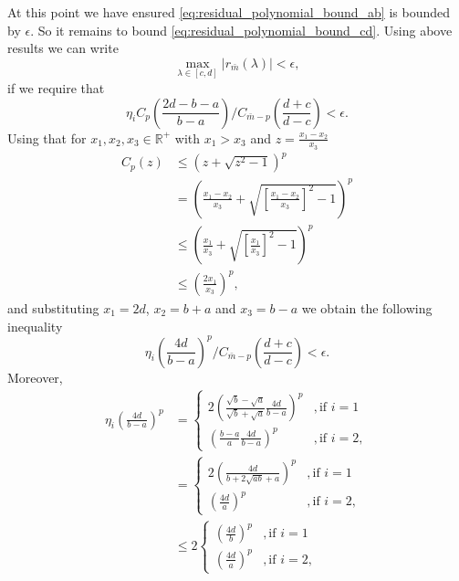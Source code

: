 At this point we have ensured \cref{eq:residual_polynomial_bound_ab} is bounded by $\epsilon$. So it remains to bound \cref{eq:residual_polynomial_bound_cd}. Using above results we can write 
\begin{equation*}
    \max_{\lambda \in [c,d]} |r_{\bar{m}}(\lambda)| < \epsilon,
\end{equation*}
if we require that
\begin{equation}
    \eta_i C_{p}\left(\frac{2d - b - a}{b - a}\right) /C_{\bar{m}-p}\left(\frac{d+c}{d-c}\right) < \epsilon.
    \label{eq:relative_error_bound_mp}
\end{equation}
Using that for $x_1, x_2, x_3 \in \mathbb{R}^+$ with $x_1 > x_3$ and $z = \frac{x_1 - x_2}{x_3}$
\begin{align*}
    C_p(z) & \leq \left(z + \sqrt{z^2 - 1}\right)^p \\
    & = \left( \frac{x_1 - x_2}{x_3} + \sqrt{ \left[\frac{x_1 - x_2}{x_3}\right]^2 -1}\right)^p \\
    & \leq \left( \frac{x_1}{x_3} + \sqrt{ \left[\frac{x_1}{x_3}\right]^2 - 1}\right)^p \\
    & \leq \left( \frac{2x_1}{x_3}\right)^p,
\end{align*}
and substituting $x_1 = 2d$, $x_2 = b + a$ and $x_3 = b - a$ we obtain the following inequality
\begin{equation*}
    \eta_i \left(\frac{4d}{b-a} \right)^p /C_{\bar{m}-p}\left(\frac{d+c}{d-c}\right) < \epsilon. 
\end{equation*}
Moreover,
\begin{align*}
    \eta_i \left(\frac{4d}{b-a}\right)^p &= 
    \begin{cases}
        2\left(\frac{\sqrt{b} - \sqrt{a}}{\sqrt{b} + \sqrt{a}} \frac{4d}{b-a}\right)^p &, \text{if } i = 1\\
        \left(\frac{b - a}{a}\frac{4d}{b-a}\right)^p &, \text{if } i = 2,
    \end{cases}\\
    &=
    \begin{cases}
        2\left(\frac{4d}{b + 2\sqrt{ab} + a}\right)^p &, \text{if } i = 1\\
        \left(\frac{4d}{a}\right)^p &, \text{if } i = 2,
    \end{cases}\\
    &\leq 2
    \begin{cases}
        \left(\frac{4d}{b}\right)^p &, \text{if } i = 1\\
        \left(\frac{4d}{a}\right)^p &, \text{if } i = 2,
    \end{cases}
\end{align*}
